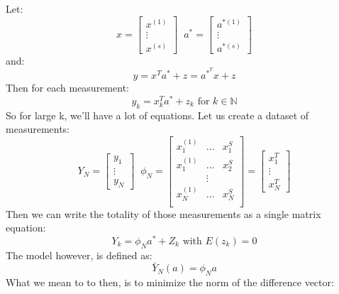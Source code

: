 Let:
\begin{equation}
    x = \begin{bmatrix}
        x^{(1)}  \\
        \vdots\\
        x^{(s)}
    \end{bmatrix}
    \;\;
a^{*} = \begin{bmatrix}
        a^{*(1)}  \\
        \vdots\\
        a^{*(s)}
    \end{bmatrix}
\end{equation}
and:
\begin{equation}
    y = x^{T}a^{*} + z = a^{*}^{T}x + z
\end{equation}
Then for each measurement:
\begin{equation}
    y_k = x^{T}_ka^{*} + z_k \text{ for }k\in \mathbb{N}
\end{equation}
So for large k, we'll have a lot of equations. Let us create a dataset of measurements:
\begin{equation}
    Y_N = \begin{bmatrix}
        y_1  \\
        \vdots\\
        y_N
    \end{bmatrix}
    \;\;
    \phi_N = \begin{bmatrix}
        x_1^{(1)} & \hdots & x_1^{S}  \\
        x_1^{(1)} & \hdots & x_2^{S}  \\
              & \vdots &   \\
        x_N^{(1)} & \hdots & x_N^{S}  \\
    \end{bmatrix} = 
    \begin{bmatrix}
        x_1^{T}\\
        \vdots\\
        x_N^{T}
    \end{bmatrix}
\end{equation}
Then we can write the totality of those measurements as a single matrix equation:
\begin{equation}
    Y_k = \phi_N a^{*} + Z_k \text{ with } E(z_k) = 0
\end{equation}
The model however, is defined as:
\begin{equation}
    \bar{Y}_N(a) = \phi_Na
\end{equation}
What we mean to to then, is to minimize the norm of the difference vector:
